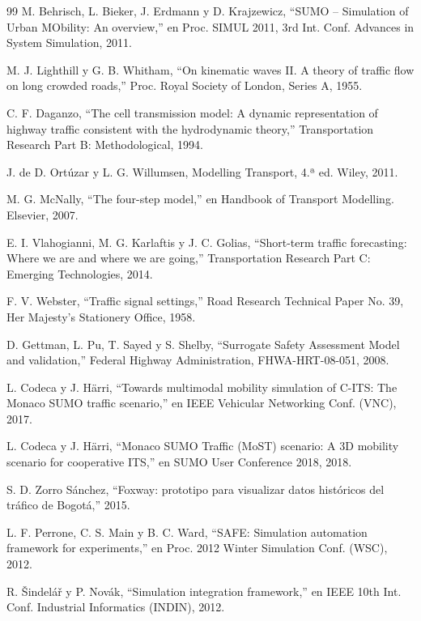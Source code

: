 \begin{thebibliography}{99}
 M. Behrisch, L. Bieker, J. Erdmann y D. Krajzewicz, ``SUMO -- Simulation of Urban MObility: An overview,'' en Proc. SIMUL 2011, 3rd Int. Conf. Advances in System Simulation, 2011.

 M. J. Lighthill y G. B. Whitham, ``On kinematic waves II. A theory of traffic flow on long crowded roads,'' Proc. Royal Society of London, Series A, 1955.

 C. F. Daganzo, ``The cell transmission model: A dynamic representation of highway traffic consistent with the hydrodynamic theory,'' Transportation Research Part B: Methodological, 1994.

 J. de D. Ortúzar y L. G. Willumsen, Modelling Transport, 4.ª ed. Wiley, 2011.

 M. G. McNally, ``The four-step model,'' en Handbook of Transport Modelling. Elsevier, 2007.

 E. I. Vlahogianni, M. G. Karlaftis y J. C. Golias, ``Short-term traffic forecasting: Where we are and where we are going,'' Transportation Research Part C: Emerging Technologies, 2014.

 F. V. Webster, ``Traffic signal settings,'' Road Research Technical Paper No. 39, Her Majesty's Stationery Office, 1958.

 D. Gettman, L. Pu, T. Sayed y S. Shelby, ``Surrogate Safety Assessment Model and validation,'' Federal Highway Administration, FHWA-HRT-08-051, 2008.

 L. Codeca y J. Härri, ``Towards multimodal mobility simulation of C-ITS: The Monaco SUMO traffic scenario,'' en IEEE Vehicular Networking Conf. (VNC), 2017.

 L. Codeca y J. Härri, ``Monaco SUMO Traffic (MoST) scenario: A 3D mobility scenario for cooperative ITS,'' en SUMO User Conference 2018, 2018.

 S. D. Zorro Sánchez, ``Foxway: prototipo para visualizar datos históricos del tráfico de Bogotá,'' 2015.

 L. F. Perrone, C. S. Main y B. C. Ward, ``SAFE: Simulation automation framework for experiments,'' en Proc. 2012 Winter Simulation Conf. (WSC), 2012.

 R. Šindelář y P. Novák, ``Simulation integration framework,'' en IEEE 10th Int. Conf. Industrial Informatics (INDIN), 2012.

\end{thebibliography}
